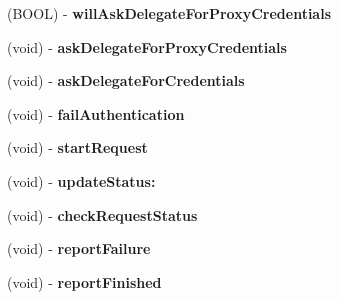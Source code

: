 \begin{DoxyCompactItemize}
\item 
\hypertarget{interface_a_s_i_h_t_t_p_request_07_08_a52ecd8ea9d13c585c86a7f9031f1d2e8}{
(\-B\-O\-O\-L) -\/ {\bfseries will\-Ask\-Delegate\-For\-Proxy\-Credentials}}
\label{interface_a_s_i_h_t_t_p_request_07_08_a52ecd8ea9d13c585c86a7f9031f1d2e8}

\item 
\hypertarget{interface_a_s_i_h_t_t_p_request_07_08_a545869781fbd1e24ed126da754536006}{
(void) -\/ {\bfseries ask\-Delegate\-For\-Proxy\-Credentials}}
\label{interface_a_s_i_h_t_t_p_request_07_08_a545869781fbd1e24ed126da754536006}

\item 
\hypertarget{interface_a_s_i_h_t_t_p_request_07_08_a44501e22716b6373457e7f235775662c}{
(void) -\/ {\bfseries ask\-Delegate\-For\-Credentials}}
\label{interface_a_s_i_h_t_t_p_request_07_08_a44501e22716b6373457e7f235775662c}

\item 
\hypertarget{interface_a_s_i_h_t_t_p_request_07_08_aa65e69f36b090b963669094ce4e3ba31}{
(void) -\/ {\bfseries fail\-Authentication}}
\label{interface_a_s_i_h_t_t_p_request_07_08_aa65e69f36b090b963669094ce4e3ba31}

\item 
\hypertarget{interface_a_s_i_h_t_t_p_request_07_08_ae64756aed5b2103d48f7a10c04916c60}{
(void) -\/ {\bfseries start\-Request}}
\label{interface_a_s_i_h_t_t_p_request_07_08_ae64756aed5b2103d48f7a10c04916c60}

\item 
\hypertarget{interface_a_s_i_h_t_t_p_request_07_08_ab0847444e15b9b0263c5bedd8faa151a}{
(void) -\/ {\bfseries update\-Status\-:}}
\label{interface_a_s_i_h_t_t_p_request_07_08_ab0847444e15b9b0263c5bedd8faa151a}

\item 
\hypertarget{interface_a_s_i_h_t_t_p_request_07_08_a068fc55ba6cb87ad880bded7fd78ab27}{
(void) -\/ {\bfseries check\-Request\-Status}}
\label{interface_a_s_i_h_t_t_p_request_07_08_a068fc55ba6cb87ad880bded7fd78ab27}

\item 
\hypertarget{interface_a_s_i_h_t_t_p_request_07_08_af147c15ba579966f7d4793ebe1eb881b}{
(void) -\/ {\bfseries report\-Failure}}
\label{interface_a_s_i_h_t_t_p_request_07_08_af147c15ba579966f7d4793ebe1eb881b}

\item 
\hypertarget{interface_a_s_i_h_t_t_p_request_07_08_aec6fbf664802e3be7fd4c24a9824e219}{
(void) -\/ {\bfseries report\-Finished}}
\label{interface_a_s_i_h_t_t_p_request_07_08_aec6fbf664802e3be7fd4c24a9824e219}


\end{DoxyCompactItemize}
